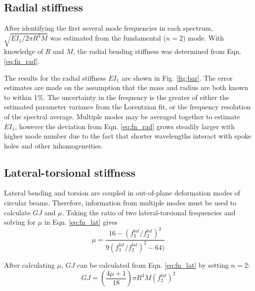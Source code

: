\documentclass[../thesis.tex]{subfiles}
\begin{document}
\subsection{Radial stiffness}

After identifying the first several mode frequencies in each spectrum, $\sqrt{EI_1/2\pi R^3M}$ was estimated from the fundamental ($n=2$) mode. With knowledge of $R$ and $M$, the radial bending stiffness was determined from Eqn. \ref{eq:fn_rad}.

The results for the radial stiffness $EI_1$ are shown in Fig. \ref{fig:bar}. The error estimates are made on the assumption that the mass and radius are both known to within 1\%. The uncertainty in the frequency is the greater of either the estimated parameter variance from the Lorentzian fit, or the frequency resolution of the spectral average. Multiple modes may be averaged together to estimate $EI_1$, however the deviation from Eqn. \ref{eq:fn_rad} grows steadily larger with higher mode number due to the fact that shorter wavelengths interact with spoke holes and other inhomogeneities.


\subsection{Lateral-torsional stiffness}

Lateral bending and torsion are coupled in out-of-plane deformation modes of circular beams. Therefore, information from multiple modes must be used to calculate $GJ$ and $\mu$. Taking the ratio of two lateral-torsional frequencies and solving for $\mu$ in Eqn. \ref{eq:fn_lat} gives
  \begin{equation}\label{eq:mu}
  \mu = \frac{16 - (f_3^{lat}/f_2^{lat})^2}{9(f_3^{lat}/f_2^{lat})^2 - 64)}
  \end{equation}

After calculating $\mu$, $GJ$ can be calculated from Eqn. \ref{eq:fn_lat} by setting $n=2$:
  \begin{equation}\label{eq:GJ}
  GJ = \left(\frac{4\mu + 1}{18} \right ) \pi R^3M(f_2^{lat})^2
  \end{equation}
\end{document}
